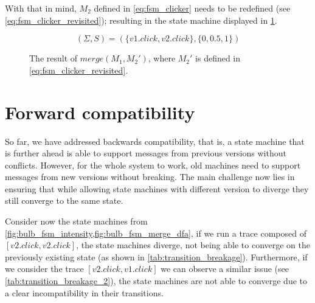 \documentclass[a4paper]{article}
\begin{document}
With that in mind, $M_2$ defined in \cref{eq:fsm_clicker} needs to be redefined (see \cref{eq:fsm_clicker_revisited});
resulting in the state machine displayed in \cref{fig:bulb_fsm_merge_dfa_upgraded}.

\begin{equation}
    (\Sigma, S) = (\{v1.click, v2.click\}, \{0, 0.5, 1\})
    \label{eq:fsm_clicker_revisited}
\end{equation}


\begin{figure}[ht]
    \centering
    \caption{The result of $merge(M_1, M_{2}')$, where $M_{2}'$ is defined in \cref{eq:fsm_clicker_revisited}.}
    \label{fig:bulb_fsm_merge_dfa_upgraded}
\end{figure}

\section*{Forward compatibility}

So far, we have addressed backwards compatibility, that is, a state machine that is further ahead
is able to support messages from previous versions without conflicts. However, for the whole system to work,
old machines need to support messages from new versions without breaking.
The main challenge now lies in ensuring that while allowing state machines with different version to diverge
they still converge to the same state.

Consider now the state machines from \cref{fig:bulb_fsm_intensity,fig:bulb_fsm_merge_dfa},
if we run a trace composed of $[v2.click, v2.click]$, the state machines diverge, not being able to
converge on the previously existing state (as shown in \cref{tab:transition_breakage}).
Furthermore, if we consider the trace $[v2.click, v1.click]$ we can observe a similar issue (see \cref{tab:transition_breakage_2}),
the state machines are not able to converge due to a clear incompatibility in their transitions.
\end{document}

